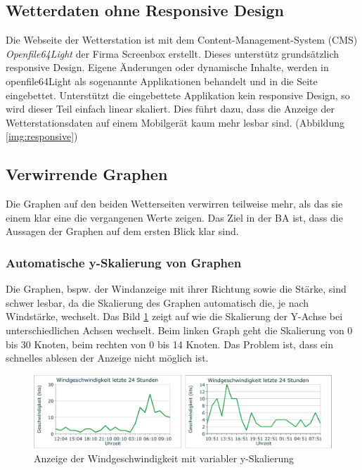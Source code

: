 \subsection{Wetterdaten ohne Responsive Design}
Die Webseite der Wetterstation ist mit dem Content-Management-System (CMS) \textit{Openfile64Light} der Firma Screenbox erstellt. Dieses unterstütz grundsätzlich responsive Design. Eigene Änderungen oder dynamische Inhalte, werden in openfile64Light als sogenannte Applikationen behandelt und in die Seite eingebettet. Unterstützt die eingebettete Applikation kein responsive Design, so wird dieser Teil einfach linear skaliert. Dies führt dazu, dass die Anzeige der Wetterstationsdaten auf einem Mobilgerät kaum mehr lesbar sind. (Abbildung \ref{img:responsive})





\subsection{Verwirrende Graphen}
Die Graphen auf den beiden Wetterseiten verwirren teilweise mehr, als das sie einem klar eine die vergangenen Werte zeigen. Das Ziel in der BA ist, dass die Aussagen der Graphen auf dem ersten Blick klar sind.

\subsubsection*{Automatische y-Skalierung von Graphen}
Die Graphen, bspw. der Windanzeige mit ihrer Richtung sowie die Stärke, sind schwer lesbar, da die Skalierung des Graphen automatisch die, je nach Windstärke, wechselt. Das Bild \ref{img:wind-geschw} zeigt auf wie die Skalierung der Y-Achse bei unterschiedlichen Achsen wechselt. Beim linken Graph geht die Skalierung von 0 bis 30 Knoten, beim rechten von 0 bis 14 Knoten. Das Problem ist, dass ein schnelles ablesen der Anzeige nicht möglich ist.

\begin{figure}[h!]
	\centering
	\includegraphics[width=1\linewidth]{img/wind-geschw}
	\caption{Anzeige der Windgeschwindigkeit mit variabler y-Skalierung}
	\label{img:wind-geschw}
\end{figure}



